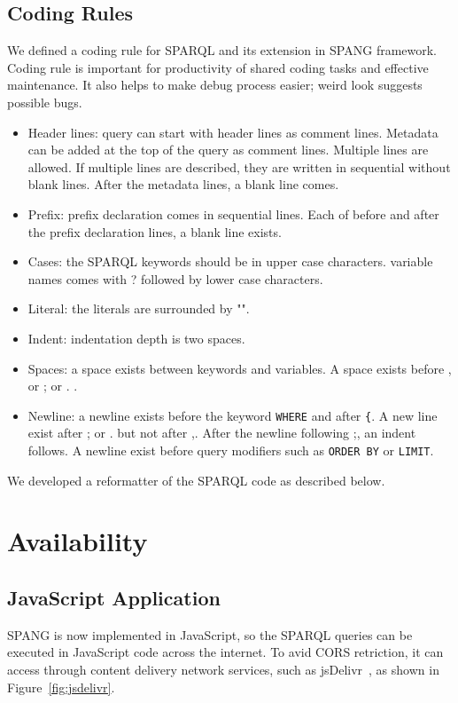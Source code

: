 \documentclass[runningheads]{llncs}
\begin{document}
\subsection{Coding Rules}
We defined a coding rule for SPARQL and its extension in SPANG framework. Coding rule is important for productivity of shared coding tasks and effective maintenance. It also helps to make debug process easier; weird look suggests possible bugs. 
\begin{itemize}
    \item Header lines: query can start with header lines as comment lines. Metadata can be added at the top of the query as comment lines. Multiple lines are allowed. If multiple lines are described, they are written in sequential without blank lines. After the metadata lines, a blank line comes.
    \item Prefix: prefix declaration comes in sequential lines. Each of before and after the prefix declaration lines, a blank line exists.
    \item Cases: the SPARQL keywords should be in upper case characters. variable names comes with ? followed by lower case characters.
    \item Literal: the literals are surrounded by "".
    \item Indent: indentation depth is two spaces.
    \item Spaces: a space exists between keywords and variables. A space exists before , or ; or . .
    \item Newline: a newline exists before the keyword \texttt{WHERE} and after \texttt{\{}. A new line exist after ; or . but not after ,. After the newline following ;, an indent follows. A newline exist before query modifiers such as \texttt{ORDER BY} or \texttt{LIMIT}.
\end{itemize}
We developed a reformatter of the SPARQL code as described below.


\section{Availability}


\subsection{JavaScript Application}
SPANG is now implemented in JavaScript, so the SPARQL queries can be executed in JavaScript code across the internet. To avid CORS retriction, it can access through content delivery network services, such as jsDelivr~\cite{jsdelivr}, as shown in Figure~\ref{fig:jsdelivr}.
\end{document}
